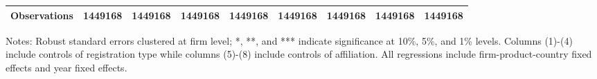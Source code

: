 \documentclass[12pt]{article}
\begin{document}
\begin{table}
\begin{threeparttable}
\begin{tabular}{lcccccccc}
			Observations & 1449168 & 1449168 & 1449168 & 1449168 & 1449168 & 1449168 & 1449168 & 1449168\\
			\bottomrule
		\end{tabular}
		\begin{tablenotes}
			\footnotesize
			\item[Notes:] Robust standard errors clustered at firm level; *, **, and *** indicate significance at 10\%, 5\%, and 1\% levels. Columns (1)-(4) include controls of registration type while columns (5)-(8) include controls of affiliation. All regressions include firm-product-country fixed effects and year fixed effects.
		\end{tablenotes}
	\end{threeparttable}
	\label{tab.robust.ownership}
\end{table}
\end{document}
